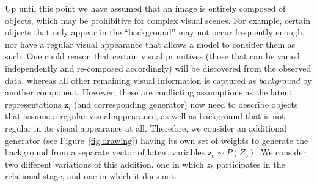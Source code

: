 \documentclass{article}
\begin{document}

Up until this point we have assumed that an image is entirely composed of objects, which may be prohibitive for complex visual scenes.
For example, certain objects that only appear in the ``background'' may not occur frequently enough, nor have a regular visual appearance that allows a model to consider them as such.
One could reason that certain visual primitives (those that can be varied independently and re-composed accordingly) will be discovered from the observed data, whereas all other remaining visual information is captured as \emph{background} by another component.
However, these are conflicting assumptions as the latent representations $\bm{z}_i$ (and corresponding generator) now need to describe objects that assume a regular visual appearance, as well as background that is not regular in its visual appearance at all.
Therefore, we consider an additional generator (see Figure~\ref{fig:drawing}) having its own set of weights to generate the background from a separate vector of latent variables $\bm{z}_b \sim P(Z_b)$.
We consider two different variations of this addition, one in which $z_b$ participates in the relational stage, and one in which it does not.
\end{document}
